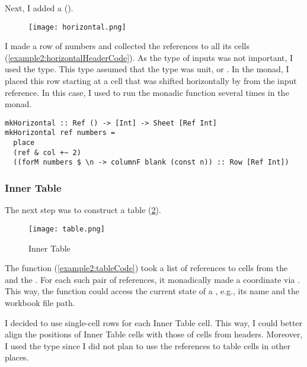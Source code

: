 Next, I added a \hh ().

\begin{figure}[h]
  \centering
  \texttt{[image: horizontal.png]}
  \caption{\hh}
  \label{example2:horizontalHeader}
\end{figure}

I made a row of numbers and collected the references to all its cells (\cref{example2:horizontalHeaderCode}). As the type of inputs was not important, I used the  type. This type assumed that the  type was unit, or \hs{()}. In the  monad, I placed this row starting at a cell that was shifted horizontally by  from the input reference. In this case, I used  to run the monadic function  several times in the  monad.

\begin{listing}[!h]
  \begin{verbatim}
mkHorizontal :: Ref () -> [Int] -> Sheet [Ref Int]
mkHorizontal ref numbers =
  place
  (ref & col +~ 2)
  ((forM numbers $ \n -> columnF blank (const n)) :: Row [Ref Int])
\end{verbatim}
  \caption{\hh}
  \label{example2:horizontalHeaderCode}
\end{listing}

\subsubsection{Inner Table}

The next step was to construct a table (\cref{example2:table}).

\begin{figure}[h]
  \centering
  \texttt{[image: table.png]}
  \caption{Inner Table}
  \label{example2:table}
\end{figure}

The function  (\cref{example2:tableCode}) took a list of references to cells from the \vh and the \hh. For each such pair of references, it monadically made a coordinate via . This way, the  function could access the current state of a , e.g., its name and the workbook file path.

I decided to use single-cell rows for each Inner Table cell. This way, I could better align the positions of Inner Table cells with those of cells from headers. Moreover, I used the  type since I did not plan to use the references to table cells in other places.

